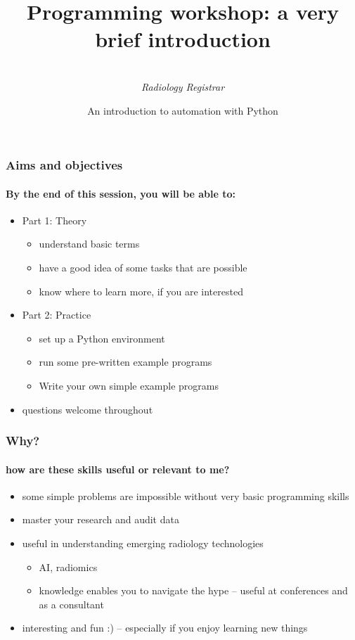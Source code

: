 \documentclass{beamer}
\title[Programming workshop]{Programming workshop: a very brief introduction}
\author{
	\sc{Mark Thurston}\\
    \textit{Radiology Registrar}
}
\institute{
	\textit{Peninsula Radiology Academy}\\
    \textit{Plymouth}
}
\date[April 2018]{An introduction to automation with Python} %
\begin{document}
    \begin{frame}[plain]
	    \titlepage
    \end{frame}


    \begin{frame}
	    \frametitle{Aims and objectives}
	    \framesubtitle{By the end of this session, you will be able to:}

	    \begin{itemize}
		    \item Part 1: Theory
			    \begin{itemize}
				    \item understand basic terms
				    \item have a good idea of some tasks that are possible
				    \item know where to learn more, if you are interested
			    \end{itemize}
	    \end{itemize}
	    \begin{itemize}
		    \item Part 2: Practice
			    \begin{itemize}
				    \item set up a Python environment
				    \item run some pre-written example programs
				    \item Write your own simple example programs
			    \end{itemize}
	    \end{itemize}
	    \begin{itemize}
		    \item questions welcome throughout
	    \end{itemize}
    \end{frame}

    \begin{frame}
	    \frametitle{Why?}
	    \framesubtitle{how are these skills useful or relevant to me?}
	    \begin{itemize}
		    \item some simple problems are impossible without very basic programming skills
		    \item master your research and audit data
		    \item useful in understanding emerging radiology technologies
			    \begin{itemize}
				    \item AI, radiomics
				    \item knowledge enables you to navigate the hype -- useful at conferences and as a consultant
			    \end{itemize}
		    \item interesting and fun :) -- especially if you enjoy learning new things
	    \end{itemize}
    \end{frame}
\end{document}
